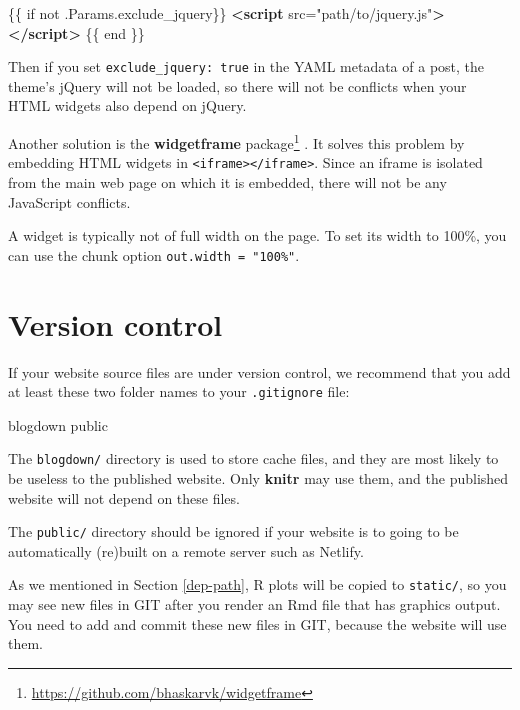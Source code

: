 \documentclass[12pt,]{krantz}
\makeatletter
\newenvironment{Shaded}{\begin{snugshade}}{\end{snugshade}}
\newcommand{\ExtensionTok}[1]{#1}
\newcommand{\KeywordTok}[1]{\textcolor[rgb]{0.13,0.29,0.53}{\textbf{#1}}}
\newcommand{\NormalTok}[1]{#1}
\newcommand{\OtherTok}[1]{\textcolor[rgb]{0.56,0.35,0.01}{#1}}
\newcommand{\StringTok}[1]{\textcolor[rgb]{0.31,0.60,0.02}{#1}}
\renewcommand{\href}[2]{#2\footnote{\url{#1}}}
\newenvironment{kframe}{%
\medskip{}
\setlength{\fboxsep}{.8em}
 \def\at@end@of@kframe{}%
 \ifinner\ifhmode%
  \def\at@end@of@kframe{\end{minipage}}%
  \begin{minipage}{\columnwidth}%
 \fi\fi%
 \def\FrameCommand##1{\hskip\@totalleftmargin \hskip-\fboxsep
 \colorbox{shadecolor}{##1}\hskip-\fboxsep
     \hskip-\linewidth \hskip-\@totalleftmargin \hskip\columnwidth}%
 \MakeFramed {\advance\hsize-\width
   \@totalleftmargin\z@ \linewidth\hsize
   \@setminipage}}%
 {\par\unskip\endMakeFramed%
 \at@end@of@kframe}
\renewenvironment{Shaded}{\begin{kframe}}{\end{kframe}}
\theoremstyle{definition}
\theoremstyle{definition}
\theoremstyle{definition}
\theoremstyle{remark}
\makeatother
\begin{document}
\begin{Shaded}
\begin{Highlighting}[]
\NormalTok{\{\{ if not .Params.exclude_jquery\}\}}
\KeywordTok{<script}\OtherTok{ src=}\StringTok{"path/to/jquery.js"}\KeywordTok{></script>}
\NormalTok{\{\{ end \}\}}
\end{Highlighting}
\end{Shaded}

Then if you set \texttt{exclude\_jquery:\ true} in the YAML metadata of
a post, the theme's jQuery will not be loaded, so there will not be
conflicts when your HTML widgets also depend on jQuery.

Another solution is the
\href{https://github.com/bhaskarvk/widgetframe}{\textbf{widgetframe}
package} \citep{R-widgetframe}. It solves this problem by embedding HTML
widgets in
\texttt{\textless{}iframe\textgreater{}\textless{}/iframe\textgreater{}}.
Since an iframe is isolated from the main web page on which it is
embedded, there will not be any JavaScript conflicts.

A widget is typically not of full width on the page. To set its width to
100\%, you can use the chunk option \texttt{out.width\ =\ "100\%"}.

\hypertarget{version-control}{%
\section{Version control}\label{version-control}}

If your website source files are under version
control, we recommend that you add at least these
two folder names to your \texttt{.gitignore} file:

\begin{Shaded}
\begin{Highlighting}[]
\ExtensionTok{blogdown}
\ExtensionTok{public}
\end{Highlighting}
\end{Shaded}

The \texttt{blogdown/} directory is used to store cache files, and they
are most likely to be useless to the published website. Only
\textbf{knitr} may use them, and the published website will not depend
on these files.

The \texttt{public/} directory should be ignored if your website is to
going to be automatically (re)built on a remote server such as Netlify.

As we mentioned in Section \ref{dep-path}, R plots will be copied to
\texttt{static/}, so you may see new files in GIT after you render an
Rmd file that has graphics output. You need to add and commit these new
files in GIT, because the website will use them.
\end{document}
